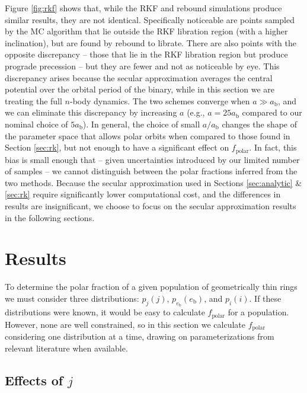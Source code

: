 \documentclass[twocolumn]{aastex631}
\begin{document}
Figure \ref{fig:rkf} shows that, while the RKF and {\sc rebound} simulations produce similar results, they are not identical. Specifically noticeable are points sampled by the MC algorithm that lie outside the RKF libration region (with a higher inclination), but are found by {\sc rebound} to librate. There are also points with the opposite discrepancy -- those that lie in the RKF libration region but produce prograde precession -- but they are fewer and not as noticeable by eye. This discrepancy arises because the secular approximation averages the central potential over the orbital period of the binary, while in this section we are treating the full $n$-body dynamics. The two schemes converge when $a \gg a_\text{b}$, and we can eliminate this discrepancy by increasing $a$ (e.g., $a=25a_\text{b}$ compared to our nominal choice of $5a_\text{b}$). In general, the choice of small $a/a_\text{b}$ changes the shape of the parameter space that allows polar orbits when compared to those found in Section \ref{sec:rk}, but not enough to have a significant effect on $f_\text{polar}$. In fact, this bias is small enough that -- given uncertainties introduced by our limited number of samples -- we cannot distinguish between the polar fractions inferred from the two methods. Because the secular approximation used in Sections \ref{sec:analytic} \& \ref{sec:rk} require significantly lower computational cost, and the differences in results are insignificant, we choose to focus on the secular approximation results in the following sections.

\section{Results}
\label{sec:results}

To determine the polar fraction of a given population of geometrically thin rings we must consider three distributions: $p_j(j)$, $p_{e_\text{b}}(e_\text{b})$, and $p_i(i)$. If these distributions were known, it would be easy to calculate $f_\text{polar}$ for a population. However, none are well constrained, so in this section we calculate $f_\text{polar}$ considering one distribution at a time, drawing on parameterizations from relevant literature when available.

\subsection{Effects of $j$}
\label{subsec:effect-j}
\end{document}
